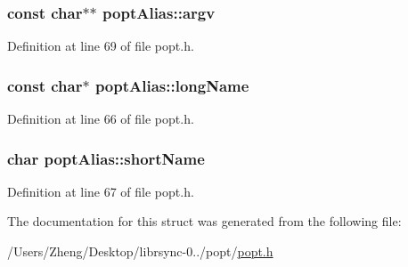 \subsubsection[{argv}]{\setlength{\rightskip}{0pt plus 5cm}const char$\ast$$\ast$ popt\+Alias\+::argv}\label{structpopt_alias_a80b40d2518a74014cf4dbbd5980e90a6}


Definition at line 69 of file popt.\+h.

\hypertarget{structpopt_alias_a92907c8fe8d1a61b281c21a4c724b7e6}{}
\subsubsection[{long\+Name}]{\setlength{\rightskip}{0pt plus 5cm}const char$\ast$ popt\+Alias\+::long\+Name}\label{structpopt_alias_a92907c8fe8d1a61b281c21a4c724b7e6}


Definition at line 66 of file popt.\+h.

\hypertarget{structpopt_alias_acc11957cb38d95c51ef7ab5ef75ef7bf}{}
\subsubsection[{short\+Name}]{\setlength{\rightskip}{0pt plus 5cm}char popt\+Alias\+::short\+Name}\label{structpopt_alias_acc11957cb38d95c51ef7ab5ef75ef7bf}


Definition at line 67 of file popt.\+h.



The documentation for this struct was generated from the following file\+:\begin{DoxyCompactItemize}
\item 
/\+Users/\+Zheng/\+Desktop/librsync-\/0../popt/\hyperlink{popt_8h}{popt.\+h}\end{DoxyCompactItemize}
